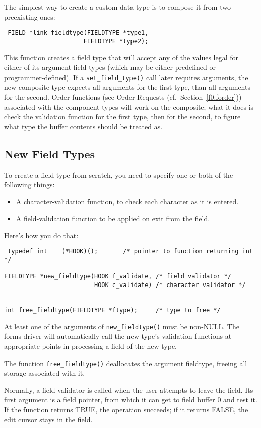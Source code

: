 \label{f0:flinktypes}The simplest way to create a custom data type is to compose it from two
preexisting ones:
\begin{verbatim} FIELD *link_fieldtype(FIELDTYPE *type1,
                      FIELDTYPE *type2);
\end{verbatim}
This function creates a field type that will accept any of the values
legal for either of its argument field types (which may be either
predefined or programmer-defined).
If a \texttt{set\_field\_type()} call later requires arguments, the new
composite type expects all arguments for the first type, than all arguments
for the second.  Order functions (see Order Requests (cf.\ Section~\ref{f0:forder}))
associated with the component types will work on the composite; what it does
is check the validation function for the first type, then for the second, to
figure what type the buffer contents should be treated as.

\subsection{New Field Types}

\label{f0:fnewtypes}To create a field type from scratch, you need to specify one or both of the
following things:
\begin{itemize}
\item A character-validation function, to check each character as it is entered.
\item A field-validation function to be applied on exit from the field.
\end{itemize}
Here's how you do that:
\begin{verbatim} typedef int	(*HOOK)();       /* pointer to function returning int */

FIELDTYPE *new_fieldtype(HOOK f_validate, /* field validator */
                         HOOK c_validate) /* character validator */


int free_fieldtype(FIELDTYPE *ftype);     /* type to free */
\end{verbatim}
At least one of the arguments of \texttt{new\_fieldtype()} must be
non-NULL.  The forms driver will automatically call the new type's
validation functions at appropriate points in processing a field of
the new type. 

The function \texttt{free\_fieldtype()} deallocates the argument
fieldtype, freeing all storage associated with it. 

Normally, a field validator is called when the user attempts to
leave the field.  Its first argument is a field pointer, from which it
can get to field buffer 0 and test it.  If the function returns TRUE,
the operation succeeds; if it returns FALSE, the edit cursor stays in
the field. 

